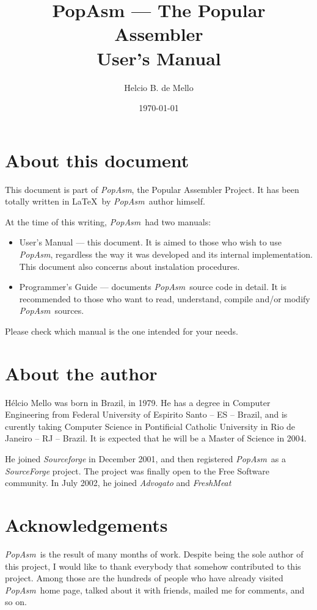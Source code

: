 \documentclass[a4paper,12pt]{book}
\title{PopAsm --- The Popular Assembler\\User's Manual}
\author{Helcio B. de Mello}
\date{\today}
\newcommand{\popasm}{\emph{PopAsm}}
\begin{document}
\maketitle

\chapter*{About this document}
This document is part of \popasm, the Popular Assembler Project.
It has been totally written in \LaTeX\ by
\popasm\ author himself.

At the time of this writing, \popasm\ had two manuals:

\begin{itemize}
\item{User's Manual} --- this document. It is aimed to those who wish
to use \popasm, regardless the way
it was developed and its internal implementation. This document also
concerns about instalation procedures.
\item{Programmer's Guide} --- documents \popasm\ source code in
detail. It is recommended to those who
want to read, understand, compile and/or modify \popasm\ sources.
\end{itemize}

Please check which manual is the one intended for your needs.

\chapter*{About the author}
H\'elcio Mello was born in Brazil, in 1979. He has a degree in Computer
Engineering from Federal University of
Espirito Santo -- ES -- Brazil\cite{UFES}, and is curently taking
Computer Science in Pontificial Catholic
University in Rio de Janeiro -- RJ -- Brazil\cite{PUC}. It is expected
that he will be a Master of Science in 2004.

He joined \emph{Sourceforge}\cite{SF} in December 2001, and then
registered \popasm\ as a \emph{SourceForge}
project. The project was finally open to the Free Software community.
In July 2002, he joined \emph{Advogato}
\cite{ADV}\cite{ADVPRSN} and \emph{FreshMeat}\cite{FRESH}

\chapter*{Acknowledgements}
\popasm\ is the result of many months of work. Despite being the
sole author of this project, I would like to
thank everybody that somehow contributed to this project. Among those
are the hundreds of people who have already
visited \popasm\ home page, talked about it with friends, mailed
me for comments, and so on.
\end{document}
